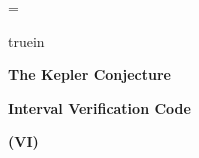\magnification=
\nopagenumbers

\hbox{}
 truein
\centerline{\bf The Kepler Conjecture}
\bigskip
\centerline{\bf Interval Verification Code}
\bigskip
\centerline{\bf (VI)}
\vfill
\eject
\bye

